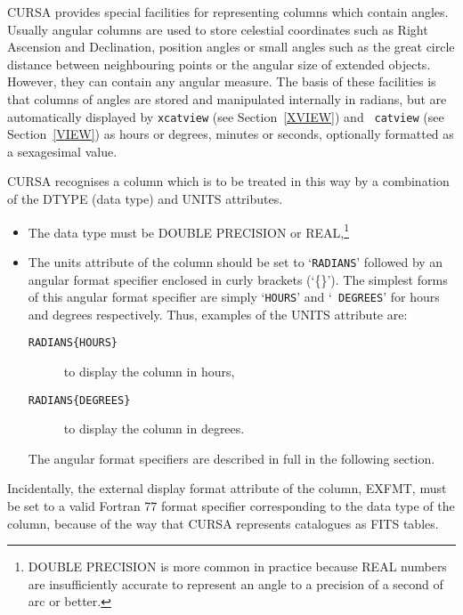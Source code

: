 \documentclass[twoside,11pt]{article}
\renewcommand{\_}{\texttt{\symbol{95}}}
\begin{document}
CURSA provides special facilities for representing columns which 
contain angles. Usually angular columns are used to store celestial
coordinates such as Right Ascension and Declination, position angles
or small angles such as the great circle distance between neighbouring
points or the angular size of extended objects.  However, they
can contain any angular measure. The basis of these facilities is that
columns of angles are stored and manipulated internally in radians, but are
automatically displayed by {\tt xcatview} (see Section~\ref{XVIEW}) and {\tt
catview} (see Section~\ref{VIEW}) as hours or degrees, minutes or seconds,
optionally formatted as a sexagesimal value.

CURSA recognises a column which is to be treated in this way by a
combination of the DTYPE (data type) and UNITS attributes.

\begin{itemize}

  \item The data type must be DOUBLE PRECISION or 
   REAL,\footnote{DOUBLE PRECISION is more common in practice because
   REAL numbers are insufficiently accurate to represent an angle to
   a precision of a second of arc or better.}

  \item The units attribute of the column should be set to 
   `{\tt RADIANS}' followed by an angular format specifier 
   enclosed in curly brackets (`\{\}'). The simplest forms of this 
   angular format specifier are simply `{\tt HOURS}' and `{\tt 
   DEGREES}' for hours and degrees respectively. Thus, examples of 
   the UNITS attribute are:

  \begin{description}

    \item[{\tt RADIANS\{HOURS\}}] to display the column in hours,

    \item[{\tt RADIANS\{DEGREES\}}] to display the column in degrees.

  \end{description}

   The angular format specifiers are described in full in the following
   section.

\end{itemize}

Incidentally, the external display format attribute of the column, EXFMT,
must be set to a valid Fortran 77 format specifier corresponding to the 
data type of the column, because of the way that CURSA represents
catalogues as FITS tables.
\end{document}
